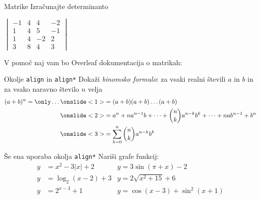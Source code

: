 \begin{frame}{Matrike}
	Izračunajte determinanto

		$\begin{vmatrix}
			-1 & 4 & 4 & -2 \\
			1 & 4 & 5 & -1 \\
			1 & 4 & -2 & 2 \\
			3 & 8 & 4 & 3 
		\end{vmatrix}$

	V pomoč naj vam bo Overleaf dokumentacija o matrikah:
	
	\href{https://www.overleaf.com/learn/latex/Matrices}{}
	\end{frame}

\begin{frame}{Okolje \texttt{align} in \texttt{align*}}
	Dokaži \emph{binomsko formulo}: za vsaki realni števili $a$ in $b$ in za vsako naravno število $n$ velja
	\begin{align*}	
	(a+b)^n =\only \ldots 
	\onslide<1> &= (a+b) (a+b) \dots (a+b)\\
	\onslide<2> &= a^n + n a^{n-1} b + \dots + \binom{n}{k} a^{n-k} b^k + \dots + n a b^{n-1} + b^n\\
	\onslide<3> &= \sum_{k=0}^n \binom{n}{k} a^{n-k} b^k\\
	\end{align*}
\end{frame}

\begin{frame}{Še ena uporaba okolja \texttt{align*}}
	Nariši grafe funkcij:
	\begin{align*}
	y &= x^2 - 3|x| + 2    & y = 3 \sin(\pi+x) - 2\\ 
	y &= \log_2(x-2) + 3   & y = 2 \sqrt{x^2+15} + 6\\ 
	y &= 2^{x-3} + 1       & y = \cos(x-3) + \sin^2(x+1)\\ 
	\end{align*}
\end{frame}


